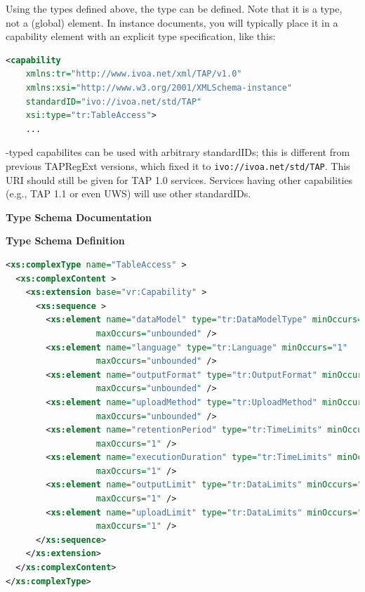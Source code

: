 \documentclass{ivoa}
\begin{document}
\label{caprec}

Using the types defined above, the 
 type can be defined.  Note that
it is a type, not a (global) element.  In instance documents, you
will typically place it in a capability element with an explicit
type specification, like this:


\begin{lstlisting}[language=XML,basicstyle=\footnotesize]
  <capability 
    xmlns:tr="http://www.ivoa.net/xml/TAP/v1.0" 
    xmlns:xsi="http://www.w3.org/2001/XMLSchema-instance" 
    standardID="ivo://ivoa.net/std/TAP" 
    xsi:type="tr:TableAccess">
    ...
\end{lstlisting}

-typed capabilites can be used with arbitrary
standardIDs; this is different from previous TAPRegExt versions, which
fixed it to \nolinkurl{ivo://ivoa.net/std/TAP}.  This URI should still
be given for TAP 1.0 services.  Services having other capabilities
(e.g., TAP 1.1 or even UWS) will use other standardIDs.

\begingroup
      	\renewcommand*\descriptionlabel[1]{%
      	\hbox to 5.5em{\emph{#1}\hfil}}
      	\vspace{2ex}\noindent\textbf{ Type Schema Documentation}



\vspace{1ex}\noindent\textbf{ Type Schema Definition}

\begin{lstlisting}[language=XML,basicstyle=\footnotesize]
<xs:complexType name="TableAccess" >
  <xs:complexContent >
    <xs:extension base="vr:Capability" >
      <xs:sequence >
        <xs:element name="dataModel" type="tr:DataModelType" minOccurs="0"
                  maxOccurs="unbounded" />
        <xs:element name="language" type="tr:Language" minOccurs="1"
                  maxOccurs="unbounded" />
        <xs:element name="outputFormat" type="tr:OutputFormat" minOccurs="1"
                  maxOccurs="unbounded" />
        <xs:element name="uploadMethod" type="tr:UploadMethod" minOccurs="0"
                  maxOccurs="unbounded" />
        <xs:element name="retentionPeriod" type="tr:TimeLimits" minOccurs="0"
                  maxOccurs="1" />
        <xs:element name="executionDuration" type="tr:TimeLimits" minOccurs="0"
                  maxOccurs="1" />
        <xs:element name="outputLimit" type="tr:DataLimits" minOccurs="0"
                  maxOccurs="1" />
        <xs:element name="uploadLimit" type="tr:DataLimits" minOccurs="0"
                  maxOccurs="1" />
      </xs:sequence>
    </xs:extension>
  </xs:complexContent>
</xs:complexType>
\end{lstlisting}
\end{document}
